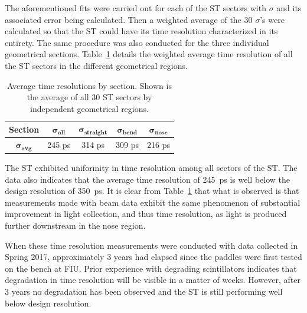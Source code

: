 
The aforementioned fits were carried out for each of the ST sectors with $\sigma$ and its associated error being calculated.  Then a weighted average of the 30 $\sigma$'s were calculated so that the ST could have its time resolution characterized in its entirety.  The same procedure was also conducted for the three individual geometrical sections.  Table~\ref{tab:time_res_section} details the weighted average time resolution of all the ST sectors in the different geometrical regions.
	\begin{table}[htbp]
		\centering
		\begin{tabular}{|c|c|c|c|c|}
			\hline  \textbf{Section} & $\mathbf{\sigma_{all}}$ & $\mathbf{\sigma_{straight}}$ & $\mathbf{\sigma_{bend}}$ & $\mathbf{\sigma_{nose}}$ \\ 
			\hline $\mathbf{\sigma_{avg}}$ & 245 ps & 314 ps & 309 ps & 216 ps \\ 
			\hline 
		\end{tabular}
		\caption{Average time resolutions by section. Shown is the average of all 30 ST sectors by independent geometrical regions.}
		\label{tab:time_res_section}
	\end{table}

The ST exhibited uniformity in time resolution among all sectors of the ST. The data also indicates that the average time resolution of 245~ps is well below the design resolution of 350~ps.  It is clear from Table~\ref{tab:time_res_section} that what is observed is that measurements made with beam data exhibit the same phenomenon of substantial improvement in light collection, and thus time resolution, as light is produced further downstream in the nose region.

When these time resolution measurements were conducted with data collected in Spring 2017, approximately 3 years had elapsed since the paddles were first tested on the bench at FIU.  Prior experience with degrading scintillators indicates that degradation in time resolution will be visible in a matter of weeks.  However, after 3 years no degradation has been observed and the ST is still performing well below design resolution.
